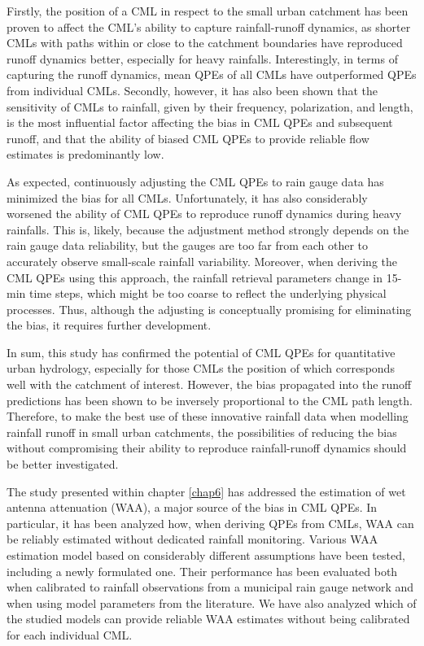\documentclass{ctuthesis}\usepackage[]{graphicx}\usepackage[]{color}
\begin{document}
Firstly, the position of a CML in respect to the small urban catchment has been proven to affect the CML's ability to capture rainfall-runoff dynamics, as shorter CMLs with paths within or close to the catchment boundaries have reproduced runoff dynamics better, especially for heavy rainfalls. Interestingly, in terms of capturing the runoff dynamics, mean QPEs of all CMLs have outperformed QPEs from individual CMLs. Secondly, however, it has also been shown that the sensitivity of CMLs to rainfall, given by their frequency, polarization, and length, is the most influential factor affecting the bias in CML QPEs and subsequent runoff, and that the ability of biased CML QPEs to provide reliable flow estimates is predominantly low. 

As expected, continuously adjusting the CML QPEs to rain gauge data has minimized the bias for all CMLs. Unfortunately, it has also considerably worsened the ability of CML QPEs to reproduce runoff dynamics during heavy rainfalls. This is, likely, because the adjustment method strongly depends on the rain gauge data reliability, but the gauges are too far from each other to accurately observe small-scale rainfall variability. Moreover, when deriving the CML QPEs using this approach, the rainfall retrieval parameters change in 15-min time steps, which might be too coarse to reflect the underlying physical processes. Thus, although the adjusting is conceptually promising for eliminating the bias, it requires further development.

In sum, this study has confirmed the potential of CML QPEs for quantitative urban hydrology, especially for those CMLs the position of which corresponds well with the catchment of interest. However, the bias propagated into the runoff predictions has been shown to be inversely proportional to the CML path length. Therefore, to make the best use of these innovative rainfall data when modelling rainfall runoff in small urban catchments, the possibilities of reducing the bias without compromising their ability to reproduce rainfall-runoff dynamics should be better investigated.


The study presented within chapter \ref{chap6} has addressed the estimation of wet antenna attenuation (WAA), a major source of the bias in CML QPEs. In particular, it has been analyzed how, when deriving QPEs from CMLs, WAA can be reliably estimated without dedicated rainfall monitoring. Various WAA estimation model based on considerably different assumptions have been tested, including a newly formulated one. Their performance has been evaluated both when calibrated to rainfall observations from a municipal rain gauge network and when using model parameters from the literature. We have also analyzed which of the studied models can provide reliable WAA estimates without being calibrated for each individual CML.
\end{document}
